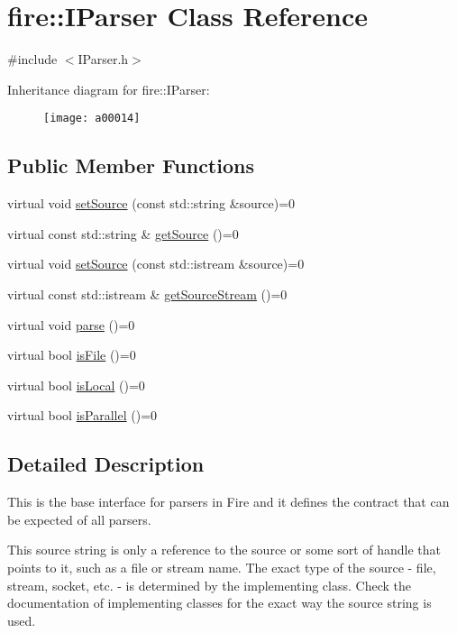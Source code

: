 \hypertarget{a00014}{}\section{fire\+:\+:I\+Parser Class Reference}
\label{a00014}


{\ttfamily \#include $<$I\+Parser.\+h$>$}

Inheritance diagram for fire\+:\+:I\+Parser\+:\begin{figure}[H]
\begin{center}
\leavevmode
\texttt{[image: a00014]}
\end{center}
\end{figure}
\subsection*{Public Member Functions}
\begin{DoxyCompactItemize}
\item 
virtual void \hyperlink{a00014_a0dbeff2b9bd8dbfb2aad7a424eef87d1}{set\+Source} (const std\+::string \&source)=0
\item 
virtual const std\+::string \& \hyperlink{a00014_ab55d2644dfa6d950d1f874e1e02df095}{get\+Source} ()=0
\item 
virtual void \hyperlink{a00014_a7748a633910e9bfc27411d6bd840496b}{set\+Source} (const std\+::istream \&source)=0
\item 
virtual const std\+::istream \& \hyperlink{a00014_ac94c7a288bf669322b93ba171c43f90e}{get\+Source\+Stream} ()=0
\item 
virtual void \hyperlink{a00014_af36ac6eedd8c27d2f418869193d7d03c}{parse} ()=0
\item 
virtual bool \hyperlink{a00014_a616c42c85d781c916e97f0ad8f1e9010}{is\+File} ()=0
\item 
virtual bool \hyperlink{a00014_a97b9e58493b3cadbc63e670b0b0e759f}{is\+Local} ()=0
\item 
virtual bool \hyperlink{a00014_a83d2882a466d694fb0aea3d846bcbed4}{is\+Parallel} ()=0
\end{DoxyCompactItemize}


\subsection{Detailed Description}
This is the base interface for parsers in Fire and it defines the contract that can be expected of all parsers.

This source string is only a reference to the source or some sort of handle that points to it, such as a file or stream name. The exact type of the source -\/ file, stream, socket, etc. -\/ is determined by the implementing class. Check the documentation of implementing classes for the exact way the source string is used.

